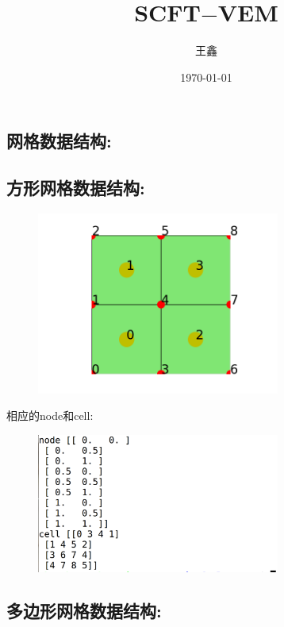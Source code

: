 \documentclass[12pt]{article}
\begin{document}
\begin{CJK}{UTF8}{gkai}
    \title{SCFT$-$VEM}
    \date{\today}
    \author{王鑫}
    \maketitle
    \section{网格数据结构:}    
    \subsection{方形网格数据结构:}
    \begin{figure}[H]
     \centering
     \includegraphics[width=8cm]{Figure_2.png}
     \caption{}  		
     \end{figure}


    相应的node和cell:\\

   \begin{figure}[H]
    \centering   
    \includegraphics[width=8cm]{4.png}
    \caption{}
    \end{figure}
    
   \subsection{多边形网格数据结构:}


\end{CJK}
\end{document}
